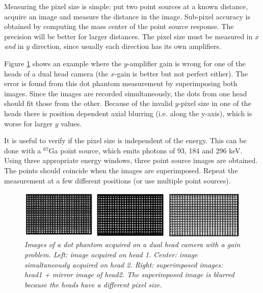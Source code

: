 Measuring the pixel size is simple: put two point sources at a known distance,
acquire an image and measure the distance in the image. Sub-pixel accuracy is
obtained by computing the mass center of the point source response. The
precision will be better for larger distances. The pixel size must be measured
in $x$ {\em and} in $y$ direction, since usually each direction has its own
amplifiers.

Figure \ref{fig:qc_gain} shows an example where the $y$-amplifier gain
is wrong for one of the heads of a dual head camera (the $x$-gain is
better but not perfect either). The error is found from this dot
phantom measurement by superimposing both images. Since the images are
recorded simultaneously, the dots from one head should fit those from
the other. Because of the invalid $y$-pixel size in one of the heads
there is position dependent axial blurring (i.e. along the y-axis),
which is worse for larger $y$ values.

It is useful to verify if the pixel size is independent of the energy. This
can be done with a $^{67}$Ga point source, which emits photons of 93, 184 and
296 keV. Using three appropriate energy windows, three point source images are
obtained. The points should coincide when the images are superimposed. Repeat
the measurement at a few different positions (or use multiple point sources).

\begin{figure}[tb]
\centering
\includegraphics[width=\figbig]{figs/fig_qc_gain.pdf}
\caption{\label{fig:qc_gain} \emph{Images of a dot phantom acquired on a dual
head camera with a gain problem. Left: image acquired on head 1. Center: image
simultaneously acquired on head 2. Right: superimposed images: head1 + mirror
image of head2. The superimposed image is blurred because the heads have a
different pixel size.}}
\end{figure}


